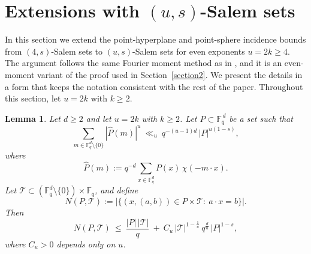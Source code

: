 \documentclass{article}
\newtheorem{lemma}[theorem]{Lemma}
\begin{document}
\section{Extensions with $(u,s)$-Salem sets}\label{sec:us-salem}

In this section we extend the point-hyperplane and point-sphere incidence bounds from
$(4,s)$-Salem sets to $(u,s)$-Salem sets for even exponents $u=2k\ge 4$.
The argument follows the same Fourier moment method as in \cite{CGKPTZ25}, and it is an
even-moment variant of the proof used in Section~\ref{section2}.
We present the details in a form that keeps the notation consistent with the rest of the paper. Throughout this section, let $u=2k$ with $k\ge 2$.


\begin{lemma}\label{lem:incidence-us}
Let $d\ge 2$ and let $u=2k$ with $k\ge 2$.
Let $P\subset \mathbb{F}_q^{\,d}$ be a set such that
\begin{equation}\label{eq:us-salem-fourier}
\sum_{m\in\mathbb{F}_q^d\setminus\{0\}} |\widehat{P}(m)|^{u}
\ \ll_u\
q^{-(u-1)d}\,|P|^{u(1-s)},
\end{equation}
where
\[
\widehat{P}(m):=q^{-d}\sum_{x\in\mathbb{F}_q^d} P(x)\,\chi(-m\cdot x).
\]
Let $\mathcal{T}\subset (\mathbb{F}_q^d\setminus\{0\})\times \mathbb{F}_q$, and define
\[
N(P,\mathcal{T})
:=
\bigl|\{(x,(a,b))\in P\times \mathcal{T}:\ a\cdot x=b\}\bigr|.
\]
Then
\[
N(P,\mathcal{T})
\ \le\
\frac{|P|\,|\mathcal{T}|}{q}
\ +\
C_u\,|\mathcal{T}|^{1-\frac{1}{u}}\,q^{\frac{d}{u}}\,|P|^{1-s},
\]
where $C_u>0$ depends only on $u$.
\end{lemma}
\end{document}
